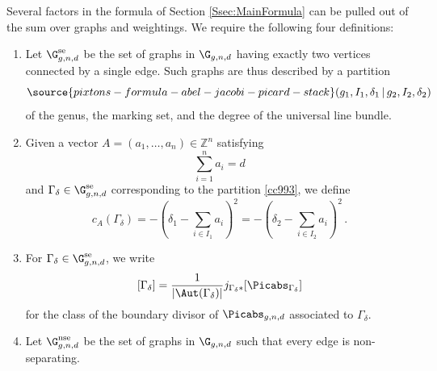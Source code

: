 Several factors in the formula of Section \ref{Ssec:MainFormula} can be pulled out of the sum over graphs and weightings.
We require the following four definitions:
\begin{enumerate}
\item[$\bullet$] Let $\G_{g,n,d}^\textup{se}$ be the set of graphs in $\G_{g,n,d}$ having exactly two vertices connected by a single edge.
Such graphs are thus described by a partition
\begin{equation}\label{cc993}
\source{pixtons-formula-abel-jacobi-picard-stack}
(g_1, I_1, \delta_1\, |\,  g_2, I_2, \delta_2)
\end{equation}
of the genus, the marking set, and the degree of the universal line bundle.
\item[$\bullet$]
Given a vector $A =(a_1,\ldots,a_n) \in \mathbb{Z}^n$ satisfying
$$\sum_{i=1}^n a_i = d$$ and
$\Gamma_{\delta} \in \G_{g,n,d}^\textup{se}$ corresponding to the partition \eqref{cc993}, we define
\[c_A(\Gamma_\delta) = - (\delta_1 - \sum_{i \in I_1} a_i)^2 =  -(\delta_2 - \sum_{i \in I_2} a_i)^2\, .\]
\item[$\bullet$] For $\Gamma_\delta \in \G_{g,n,d}^\textup{se}$, we write $$[\Gamma_\delta] = \frac{1}{|\Aut(\Gamma_\delta)|} j_{\Gamma_\delta*} [\Picabs_{\Gamma_{\delta}}]$$ for the class of the boundary divisor of $\Picabs_{g,n,d}$ associated to $\Gamma_\delta$.
\item[$\bullet$]
Let $\G_{g,n,d}^\textup{nse}$ be the set of graphs in $\G_{g,n,d}$ such that every edge is non-separating.
\end{enumerate}


